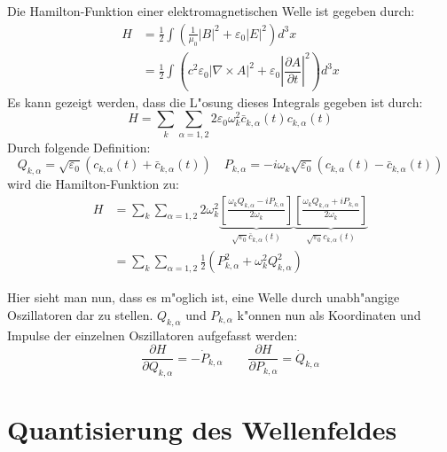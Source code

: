 Die Hamilton-Funktion einer elektromagnetischen Welle ist gegeben durch:
\begin{equation*}
\begin{split}
H &= \frac{1}{2} \int \left(\frac{1}{\mu_0}|B|^2 + \varepsilon_0|E|^2\right) d^3 x \\
	&= \frac{1}{2} \int \left(c^2 \varepsilon_0 | \nabla\times A |^2 + \varepsilon_0 \left| \dfrac{\partial A}{\partial t} \right|^2 \right) d^3 x 
\end{split}
\end{equation*}
Es kann gezeigt werden, dass die L"osung dieses Integrals gegeben ist durch:
\begin{equation*}
H = \sum_k \sum_{\alpha=1,2} 2 \varepsilon_0 \omega_k^2 \bar{c}_{k,\alpha}(t) c_{k,\alpha}(t)
\end{equation*}
Durch folgende Definition:
\begin{equation*}
Q_{k,\alpha} = \sqrt{\varepsilon_0} \left(c_{k,\alpha}(t) + \bar{c}_{k,\alpha}(t)\right) \quad P_{k,\alpha} = -i \omega_k \sqrt{\varepsilon_0} \left(c_{k,\alpha}(t) - \bar{c}_{k,\alpha}(t)\right) 
\end{equation*}
wird die Hamilton-Funktion zu:
\begin{equation} \label{fq:hamilton}
\begin{split}
H &= \sum_k \sum_{\alpha=1,2} 2 \omega_k^2 
	\underbrace{\left[ \frac{\omega_k Q_{k,\alpha} - i P_{k,\alpha}}{2 \omega_k} \right]}_{\sqrt{\varepsilon_0} \bar{c}_{k,\alpha}(t)}
	\underbrace{\left[ \frac{\omega_k Q_{k,\alpha} + i P_{k,\alpha}}{2 \omega_k} \right]}_{\sqrt{\varepsilon_0} c_{k,\alpha}(t)} \\
&= \sum_k \sum_{\alpha=1,2} \frac{1}{2} \left(P_{k,\alpha}^2 + \omega_k^2 Q_{k,\alpha}^2\right)
\end{split}
\end{equation}

Hier sieht man nun, dass es m"oglich ist, eine Welle durch unabh"angige Oszillatoren dar zu stellen.
$Q_{k,\alpha}$ und $P_{k,\alpha}$ k"onnen nun als Koordinaten und Impulse der einzelnen Oszillatoren aufgefasst werden:
\begin{equation*}
\dfrac{\partial H}{\partial Q_{k,\alpha}} = -\dot{P}_{k,\alpha} \qquad \dfrac{\partial H}{\partial P_{k,\alpha}} = \dot{Q}_{k,\alpha}
\end{equation*}

\section{Quantisierung des Wellenfeldes}

